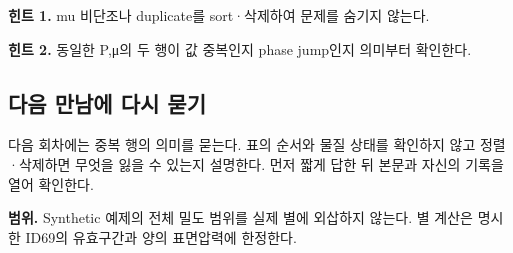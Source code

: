 \documentclass[
  10pt,
  a4paper,
]{article}
\begin{document}
\textbf{힌트 1.} mu 비단조나 duplicate를 sort·삭제하여 문제를 숨기지
않는다.

\textbf{힌트 2.} 동일한 P,μ의 두 행이 값 중복인지 phase jump인지
의미부터 확인한다.

\subsection{다음 만남에 다시
묻기}\label{uxb2e4uxc74c-uxb9ccuxb0a8uxc5d0-uxb2e4uxc2dc-uxbb3buxae30}

다음 회차에는 중복 행의 의미를 묻는다. 표의 순서와 물질 상태를 확인하지
않고 정렬·삭제하면 무엇을 잃을 수 있는지 설명한다. 먼저 짧게 답한 뒤
본문과 자신의 기록을 열어 확인한다.

\textbf{범위.} Synthetic 예제의 전체 밀도 범위를 실제 별에 외삽하지
않는다. 별 계산은 명시한 ID69의 유효구간과 양의 표면압력에 한정한다.
\end{document}

